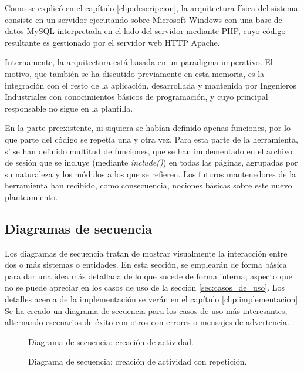 Como se explicó en el capítulo \ref{chp:descripcion}, la arquitectura física del
sistema consiste en un servidor ejecutando sobre Microsoft Windows con una base
de datos MySQL interpretada en el lado del servidor mediante PHP, cuyo código
resultante es gestionado por el servidor web HTTP Apache.

Internamente, la arquitectura está basada en un paradigma imperativo. El
motivo, que también se ha discutido previamente en esta memoria, es la
integración con el resto de la aplicación, desarrollada y mantenida por
Ingenieros Industriales con conocimientos básicos de programación, y cuyo
principal responsable no sigue en la plantilla.

En la parte preexistente, ni siquiera se habían definido apenas funciones, por
lo que parte del código se repetía una y otra vez. Para esta parte de la
herramienta, sí se han definido multitud de funciones, que se han implementado
en el archivo de sesión que se incluye (mediante \textit{include()}) en todas
las páginas, agrupadas por su naturaleza y los módulos a los que se refieren.
Los futuros mantenedores de la herramienta han recibido, como consecuencia,
nociones básicas sobre este nuevo planteamiento.

 
\subsection{Diagramas de secuencia}

Los diagramas de secuencia tratan de mostrar visualmente la interacción entre
dos o más sistemas o entidades. En esta sección, se emplearán de forma básica
para dar una idea más detallada de lo que sucede de forma interna, aspecto que
no se puede apreciar en los casos de uso de la sección \ref{sec:casos_de_uso}.
Los detalles acerca de la implementación se verán en el capítulo
\ref{chp:implementacion}. Se ha creado un diagrama de secuencia para los casos
de uso más interesantes, alternando escenarios de éxito con otros con errores o
mensajes de advertencia.

\begin{figure}
\centering
{}
\caption{Diagrama de secuencia: creación de actividad.}
\label{fig:crear_actividad}
\end{figure}

\begin{figure}
\centering
{}
\caption{Diagrama de secuencia: creación de actividad con repetición.}
\label{fig:crear_actividad_repetida}
\end{figure}

